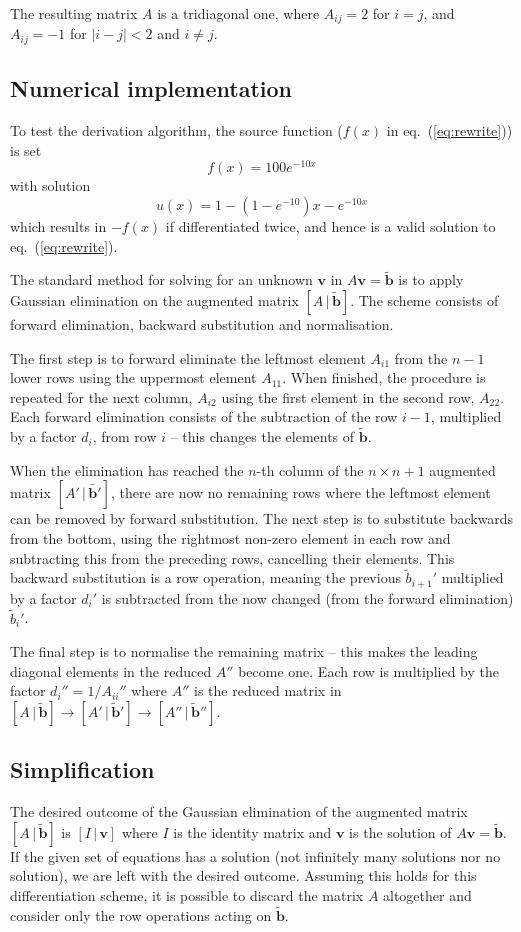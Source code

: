 \documentclass[a4paper,11pt]{article}
\begin{document}
    The resulting matrix $A$ is a tridiagonal one, where $A_{ij} = 2$ for $i=j$, and $A_{ij} = -1$ for $|i-j|<2$ and $i\neq j$.

    \subsection{Numerical implementation}
    To test the derivation algorithm, the source function ($f(x)$ in eq.~(\ref{eq:rewrite})) is set
    \[ f(x) = 100 e^{-10x} \]
    with solution
    \[ u(x) = 1 - \left( 1 - e^{-10} \right) x - e^{-10x} \]
    which results in $-f(x)$ if differentiated twice, and hence is a valid solution to eq.~(\ref{eq:rewrite}).

    The standard method for solving for an unknown $\mathbf{v}$ in $A\mathbf{v} = \tilde{\mathbf{b}}$ is to apply Gaussian elimination on the augmented matrix $[A \, | \, \tilde{\mathbf{b}}]$. The scheme consists of forward elimination, backward substitution and normalisation.
    
    The first step is to forward eliminate the leftmost element $A_{i1}$ from the $n-1$ lower rows using the uppermost element $A_{11}$. When finished, the procedure is repeated for the next column, $A_{i2}$ using the first element in the second row, $A_{22}$. Each forward elimination consists of the subtraction of the row $i-1$, multiplied by a factor $d_i$, from row $i$ -- this changes the elements of $\tilde{\mathbf{b}}$. 

    When the elimination has reached the $n$-th column of the $n \times n+1$ augmented matrix $[A' \,|\, \tilde{\mathbf{b}'}]$, there are now no remaining rows where the leftmost element can be removed by forward substitution. The next step is to substitute backwards from the bottom, using the rightmost non-zero element in each row and subtracting this from the preceding rows, cancelling their elements. This backward substitution is a row operation, meaning the previous $\tilde{b}_{i+1}'$ multiplied by a factor $d_i'$ is subtracted from the now changed (from the forward elimination) $\tilde{b}_i'$.

    The final step is to normalise the remaining matrix -- this makes the leading diagonal elements in the reduced $A''$ become one. Each row is multiplied by the factor $d_i'' = 1/A_{ii}''$ where $A''$ is the reduced matrix in $[A \,|\, \tilde{\mathbf{b}} ] \rightarrow [A' \,|\, \tilde{\mathbf{b}}' ] \rightarrow [A'' \,|\, \tilde{\mathbf{b}}'' ]$.  

    \subsection{Simplification}
    The desired outcome of the Gaussian elimination of the augmented matrix $[A \,|\, \tilde{\mathbf{b}} ]$ is $[I \, | \, \mathbf{v}]$ where $I$ is the identity matrix and $\mathbf{v}$ is the solution of $A\mathbf{v} = \tilde{\mathbf{b}}$. If the given set of equations has a solution (not infinitely many solutions nor no solution), we are left with the desired outcome. Assuming this holds for this differentiation scheme, it is possible to discard the matrix $A$ altogether and consider only the row operations acting on $\tilde{\mathbf{b}}$. 
\end{document}
